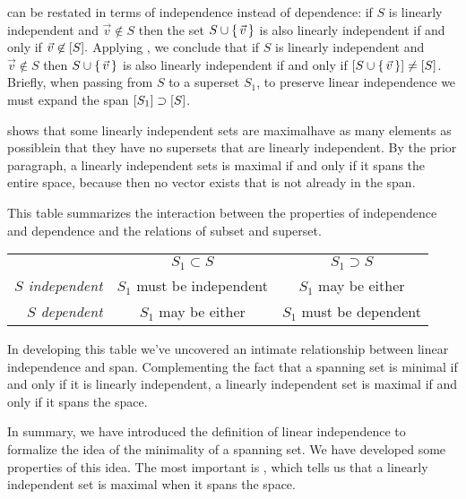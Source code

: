  can be restated
in terms of independence instead of dependence:
if \( S \) is linearly independent and \( \vec{v}\not\in S \) then
the set \( S\cup\mbox{$\{\,\vec{v}\,\}$} \)
is also linearly independent if and only if \( \vec{v}\not\in\relax [S\relax ]. \)
Applying ,
we conclude that
if \( S \) is linearly independent and \( \vec{v}\not\in S \)
then \( S\cup\mbox{$\{\,\vec{v}\,\}$} \) is also
linearly independent if and only if
\( \relax [S\cup\mbox{$\{\,\vec{v}\,\}$}\relax ]\neq\relax [S\relax ] \).
Briefly,
when passing from $S$ to a superset $S_1$,
to preserve linear independence we must expand the span
$\relax [S_1\relax ]\supset\relax [S\relax ]$.

 shows that some 
linearly independent sets are maximal\Dash have as many elements as 
possible\Dash in
that they have no supersets that are linearly independent.
By the prior paragraph, 
a linearly independent sets is maximal if and only if it
spans the 
entire space, because then no vector exists that is not already in the span.

This table summarizes the interaction between the properties of independence
and dependence and the relations of subset and superset.
\medskip
\begin{center}
  \begin{tabular}[b]{r|c|c|}
                        \multicolumn{1}{c}{}
                        &\multicolumn{1}{c}{\( S_1\subset S \)}
                        &\multicolumn{1}{c}{\( S_1\supset S \)}      \\
     \cline{2-3}
          \textit{$S$ independent} 
              &\( S_1 \) must be independent   &\( S_1 \) may be either\\
     \cline{2-3}
          \textit{$S$ dependent} 
              &\( S_1 \) may be either &\( S_1 \) must be dependent    \\
     \cline{2-3}
   \end{tabular}
\end{center}
\medskip
In developing this table we've uncovered an
intimate relationship between linear independence and span.
Complementing the fact that
a spanning set is minimal if and only if it is linearly independent,
a linearly independent set is maximal if and only if it spans the space.

In summary,
we have introduced the definition of linear independence to 
formalize the idea of the minimality of a spanning set.
We have developed some properties of this idea.
The most important is , which 
tells us that a linearly independent set is maximal when it spans the space.


